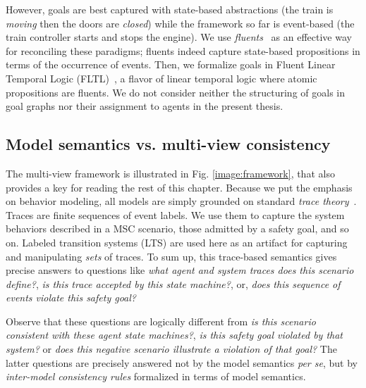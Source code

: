 However, goals are best captured with state-based abstractions (the train is \emph{moving} then the doors are \emph{closed}) while the framework so far is event-based (the train controller starts and stops the engine). We use \emph{fluents}~\cite{Miller:2002} as an effective way for reconciling these paradigms; fluents indeed capture state-based propositions in terms of the occurrence of events. Then, we formalize goals in Fluent Linear Temporal Logic (FLTL)~\cite{Giannakopoulou:2003}, a flavor of linear temporal logic where atomic propositions are fluents. We do not consider neither the structuring of goals in goal graphs nor their assignment to agents in the present thesis.

\subsection{Model semantics vs. multi-view consistency}

The multi-view framework is illustrated in Fig. \ref{image:framework}, that also provides a key for reading the rest of this chapter. Because we put the emphasis on behavior modeling, all models are simply grounded on standard \emph{trace theory}~\cite{Hoare:1985}. Traces are finite sequences of event labels. We use them to capture the system behaviors described in a MSC scenario, those admitted by a safety goal, and so on. Labeled transition systems (LTS) are used here as an artifact for capturing and manipulating \emph{sets} of traces. To sum up, this trace-based semantics gives precise answers to questions like \emph{what agent and system traces does this scenario define?}, \emph{is this trace accepted by this state machine?}, or, \emph{does this sequence of events violate this safety goal?}

Observe that these questions are logically different from \emph{is this scenario consistent with these agent state machines?}, \emph{is this safety goal violated by that system?} or \emph{does this negative scenario illustrate a violation of that goal?} The latter questions are precisely answered not by the model semantics \emph{per se}, but by \emph{inter-model consistency rules} formalized in terms of model semantics. 

